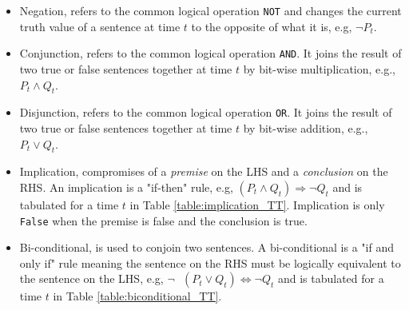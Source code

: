 \begin{itemize}
	\item Negation, refers to the common logical operation \texttt{NOT} and changes the current truth value of a sentence at time $t$ to the opposite of what it is, e.g, $\neg P_t$.
	\item Conjunction, refers to the common logical operation \texttt{AND}. It joins the result of two true or false sentences together at time $t$ by bit-wise multiplication, e.g., $P_t \wedge Q_t$.
	\item Disjunction, refers to the common logical operation \texttt{OR}. It joins the result of two true or false sentences together at time $t$ by bit-wise addition, e.g., $P_t \vee Q_t$.
	\item Implication, compromises of a \textit{premise} on the LHS and a \textit{conclusion} on the RHS. An implication is a "if-then" rule, e.g, $(P_t \wedge Q_t) \Rightarrow \neg Q_t$ and is tabulated for a time $t$ in Table \ref{table:implication_TT}. Implication is only \texttt{False} when the premise is false and the conclusion is true.
	
	\item Bi-conditional, is used to conjoin two sentences. A bi-conditional is a "if and only if" rule meaning the sentence on the RHS must be logically equivalent to the sentence on the LHS, e.g, $\neg \text{ } (P_t \vee Q_t) \Leftrightarrow \neg Q_t$ and is tabulated for a time $t$ in Table \ref{table:biconditional_TT}.
\end{itemize}

